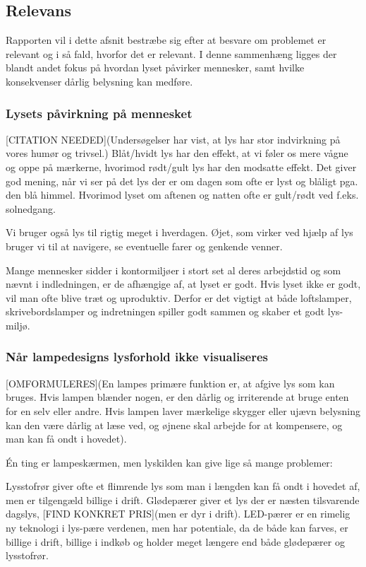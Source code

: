 \subsection{Relevans}
Rapporten vil i dette afsnit bestræbe sig efter at besvare om problemet er relevant og i så fald, hvorfor det er relevant. I denne sammenhæng ligges der blandt andet fokus på hvordan lyset påvirker mennesker, samt hvilke konsekvenser dårlig belysning kan medføre. 

\subsubsection{Lysets påvirkning på mennesket}
[CITATION NEEDED](Undersøgelser har vist, at lys har stor indvirkning på vores humør og trivsel.)
Blåt/hvidt lys har den effekt, at vi føler os mere vågne og oppe på mærkerne, hvorimod rødt/gult lys har den modsatte effekt\cite{videnskab_dk_paavirkning}. Det giver god mening, når vi ser på det lys der er om dagen som ofte er lyst og blåligt pga. den blå himmel. Hvorimod lyset om aftenen og natten ofte er gult/rødt ved f.eks. solnedgang.

Vi bruger også lys til rigtig meget i hverdagen. Øjet, som virker ved hjælp af lys bruger vi til at navigere, se eventuelle farer og genkende venner.

Mange mennesker sidder i kontormiljøer i stort set al deres arbejdstid og som nævnt i indledningen, er de afhængige af, at lyset er godt. Hvis lyset ikke er godt, vil man ofte blive træt og uproduktiv. Derfor er det vigtigt at både loftslamper, skrivebordslamper og indretningen spiller godt sammen og skaber et godt lys-miljø.

\subsubsection{Når lampedesigns lysforhold ikke visualiseres}
[OMFORMULERES](En lampes primære funktion er, at afgive lys som kan bruges. Hvis lampen blænder nogen, er den dårlig og irriterende at bruge enten for en selv eller andre. Hvis lampen laver mærkelige skygger eller ujævn belysning kan den være dårlig at læse ved, og øjnene skal arbejde for at kompensere, og man kan få ondt i hovedet)\cite{lys_konsekvenser}.

Én ting er lampeskærmen, men lyskilden kan give lige så mange problemer:

Lysstofrør giver ofte et flimrende lys som man i længden kan få ondt i hovedet af, men er tilgengæld billige i drift\cite{videnskab_dk_led}. Glødepærer giver et lys der er næsten tilsvarende dagslys, [FIND KONKRET PRIS](men er dyr i drift)\cite{videnskab_dk_led}. LED-pærer er en rimelig ny teknologi i lys-pære verdenen, men har potentiale, da de både kan farves, er billige i drift, billige i indkøb og holder meget længere end både glødepærer og lysstofrør\cite{videnskab_dk_led}.

